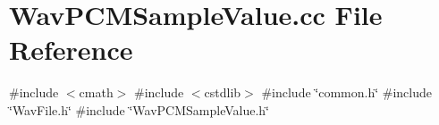 \section{Wav\+P\+C\+M\+Sample\+Value.\+cc File Reference}
\label{WavPCMSampleValue_8cc}
{\ttfamily \#include $<$cmath$>$}\newline
{\ttfamily \#include $<$cstdlib$>$}\newline
{\ttfamily \#include \char`\"{}common.\+h\char`\"{}}\newline
{\ttfamily \#include \char`\"{}Wav\+File.\+h\char`\"{}}\newline
{\ttfamily \#include \char`\"{}Wav\+P\+C\+M\+Sample\+Value.\+h\char`\"{}}\newline
